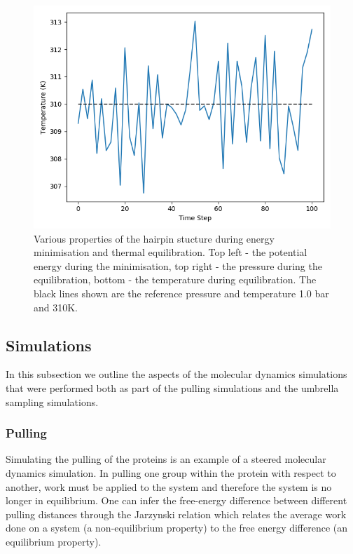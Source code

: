 \documentclass[12pt, onecolumn]{revtex4}    %
\begin{document}
\begin{figure}[h!]
\includegraphics[scale=0.4]{HairNPTT}
\caption{Various properties of the hairpin stucture during energy minimisation and thermal equilibration.  Top left - the potential energy during the minimisation, top right - the pressure during the equilibration, bottom - the temperature during equilibration.  The black lines shown are the reference pressure and temperature 1.0 bar and 310K.}
\end{figure}

\subsection{Simulations}

In this subsection we outline the aspects of the molecular dynamics simulations that were performed both as part of the pulling simulations and the umbrella sampling simulations.

\subsubsection{Pulling}

Simulating the pulling of the proteins is an example of a steered molecular dynamics simulation\cite{GMX}.  In pulling one group within the protein with respect to another, work must be applied to the system and therefore the system is no longer in equilibrium\cite{GMX}.  One can infer the free-energy difference between different pulling distances through the Jarzynski relation \cite{Jar} which relates the average work done on a system (a non-equilibrium property) to the free energy difference (an equilibrium property).\\
\end{document}
